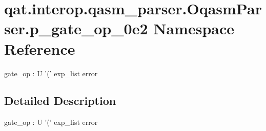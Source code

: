 \hypertarget{namespaceqat_1_1interop_1_1qasm__parser_1_1OqasmParser_1_1p__gate__op__0e2}{\section{qat.\-interop.\-qasm\-\_\-parser.\-Oqasm\-Parser.\-p\-\_\-gate\-\_\-op\-\_\-0e2 Namespace Reference}
\label{namespaceqat_1_1interop_1_1qasm__parser_1_1OqasmParser_1_1p__gate__op__0e2}
}


gate\-\_\-op \-: U '(' exp\-\_\-list error  




\subsection{Detailed Description}
gate\-\_\-op \-: U '(' exp\-\_\-list error 